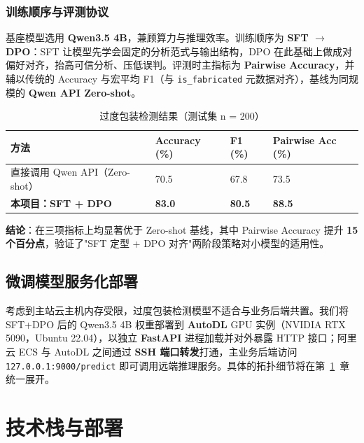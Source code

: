 \documentclass[12pt,a4paper]{ctexart}
\begin{document}
\subsubsection{训练顺序与评测协议}

基座模型选用 \textbf{Qwen3.5 4B}，兼顾算力与推理效率。训练顺序为 \textbf{SFT $\to$ DPO}：SFT 让模型先学会固定的分析范式与输出结构，DPO 在此基础上做成对偏好对齐，抬高可信分析、压低误判。评测时主指标为 \textbf{Pairwise Accuracy}，并辅以传统的 Accuracy 与宏平均 F1（与 \texttt{is\_fabricated} 元数据对齐），基线为同规模的 \textbf{Qwen API Zero-shot}。

\begin{table}[H]
\centering
\renewcommand{\arraystretch}{1.35}
\caption{过度包装检测结果（测试集 n = 200）}
\label{tab:exp-fabrication}
\begin{tabular}{L{6.0cm} C{2.2cm} C{2.2cm} C{2.6cm}}
\toprule
\textbf{方法} & \textbf{Accuracy (\%)} & \textbf{F1 (\%)} & \textbf{Pairwise Acc (\%)} \\
\midrule
直接调用 Qwen API（Zero-shot） & 70.5 & 67.8 & 73.5 \\
\textbf{本项目：SFT + DPO} & \textbf{83.0} & \textbf{80.5} & \textbf{88.5} \\
\bottomrule
\end{tabular}
\end{table}

\textbf{结论}：在三项指标上均显著优于 Zero-shot 基线，其中 Pairwise Accuracy 提升 \textbf{15 个百分点}，验证了"SFT 定型 + DPO 对齐"两阶段策略对小模型的适用性。

\subsection{微调模型服务化部署}

考虑到主站云主机内存受限，过度包装检测模型不适合与业务后端共置。我们将 SFT+DPO 后的 Qwen3.5 4B 权重部署到 \textbf{AutoDL} GPU 实例（NVIDIA RTX 5090，Ubuntu 22.04），以独立 \textbf{FastAPI} 进程加载并对外暴露 HTTP 接口；阿里云 ECS 与 AutoDL 之间通过 \textbf{SSH 端口转发}打通，主业务后端访问 \texttt{127.0.0.1:9000/predict} 即可调用远端推理服务。具体的拓扑细节将在第~\ref{sec:tech}~章统一展开。

\section{技术栈与部署}\label{sec:tech}
\end{document}
